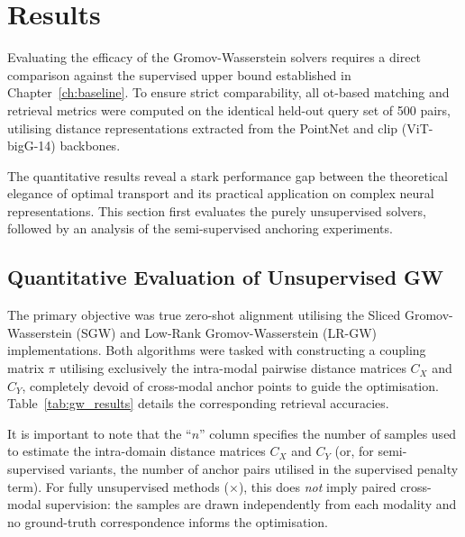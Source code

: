 \section{Results}
\label{sec:gw_results}

Evaluating the efficacy of the Gromov-Wasserstein solvers requires a direct comparison against the supervised upper bound established in Chapter~\ref{ch:baseline}. To ensure strict comparability, all \gls{ot}-based matching and retrieval metrics were computed on the identical held-out query set of 500 pairs, utilising distance representations extracted from the PointNet and \gls{clip} (ViT-bigG-14) backbones.

The quantitative results reveal a stark performance gap between the theoretical elegance of optimal transport and its practical application on complex neural representations. This section first evaluates the purely unsupervised solvers, followed by an analysis of the semi-supervised anchoring experiments.

\subsection{Quantitative Evaluation of Unsupervised GW}
\label{subsec:unsupervised_gw_results}

The primary objective was true zero-shot alignment utilising the Sliced Gromov-Wasserstein (SGW) and Low-Rank Gromov-Wasserstein (LR-GW) implementations. Both algorithms were tasked with constructing a coupling matrix $\pi$ utilising exclusively the intra-modal pairwise distance matrices $C_X$ and $C_Y$, completely devoid of cross-modal anchor points to guide the optimisation. Table~\ref{tab:gw_results} details the corresponding retrieval accuracies.

It is important to note that the ``$n$'' column specifies the number of samples used to estimate the intra-domain distance matrices $C_X$ and $C_Y$ (or, for semi-supervised variants, the number of anchor pairs utilised in the supervised penalty term). For fully unsupervised methods ($\times$), this does \emph{not} imply paired cross-modal supervision: the samples are drawn independently from each modality and no ground-truth correspondence informs the optimisation.


